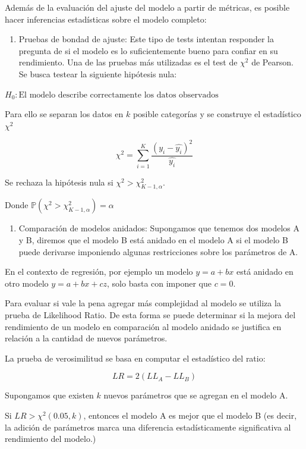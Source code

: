\documentclass[
]{book}
\providecommand{\tightlist}{%
  \setlength{\itemsep}{0pt}\setlength{\parskip}{0pt}}
\begin{document}
Además de la evaluación del ajuste del modelo a partir de métricas, es
posible hacer inferencias estadísticas sobre el modelo completo:

\begin{enumerate}
\def\labelenumi{\arabic{enumi}.}
\tightlist
\item
  Pruebas de bondad de ajuste: Este tipo de tests intentan responder
  la pregunta de si el modelo es lo suficientemente bueno para confiar
  en su rendimiento. Una de las pruebas más utilizadas es el test de
  \(\chi ^2\) de Pearson. Se busca testear la siguiente hipótesis nula:
\end{enumerate}

\(H_0: \text{El modelo describe correctamente los datos observados}\)

Para ello se separan los datos en \(k\) posible categorías y se construye
el estadístico \(\chi^2\)

\[\chi^2 = \sum_{i = 1}^{K} \frac{(y_i - \hat{y_i})^2}{\hat{y_i}}\]

Se rechaza la hipótesis nula si \(\chi^2 > \chi^{2}_{K-1, α}\).

Donde \(\mathbb{P}(\chi^2 > \chi^{2}_{K-1, α}) = α\)

\begin{enumerate}
\def\labelenumi{\arabic{enumi}.}
\setcounter{enumi}{1}
\tightlist
\item
  Comparación de modelos anidados: Supongamos que tenemos dos modelos
  A y B, diremos que el modelo B está anidado en el modelo A si el
  modelo B puede derivarse imponiendo algunas restricciones sobre los
  parámetros de A.
\end{enumerate}

En el contexto de regresión, por ejemplo un modelo \(y=a+bx\) está anidado
en otro modelo \(y=a+bx+cz\), solo basta con imponer que \(c=0\).

Para evaluar si vale la pena agregar más complejidad al modelo se
utiliza la prueba de Likelihood Ratio. De esta forma se puede determinar
si la mejora del rendimiento de un modelo en comparación al modelo
anidado se justifica en relación a la cantidad de nuevos parámetros.

La prueba de verosimilitud se basa en computar el estadístico del ratio:

\[LR = 2(LL_A - LL_B)\]

Supongamos que existen \(k\) nuevos parámetros que se agregan en el modelo
A.

Si \(LR > \chi^2(0.05, k)\), entonces el modelo A es mejor que el modelo B
(es decir, la adición de parámetros marca una diferencia
estadísticamente significativa al rendimiento del modelo.)
\end{document}
